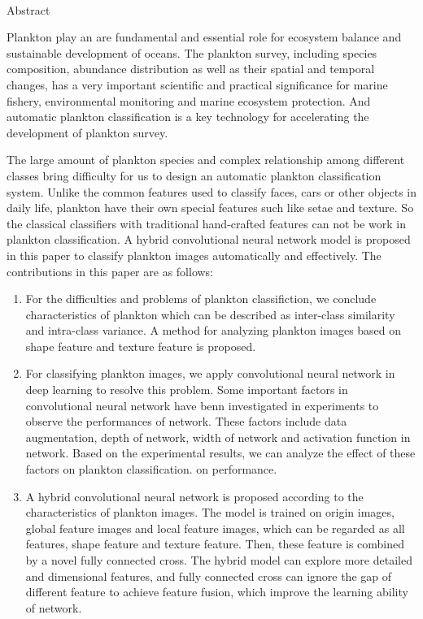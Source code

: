 \newpage

\begin{center}
  {\sanhao[1.5]\heiti\oucetitle\\\vskip7pt Abstract}
\end{center}
{\normalsize\songti

   Plankton play an are fundamental and essential role for ecosystem balance and sustainable development of oceans. The plankton survey, including species composition, abundance distribution as well as their spatial and temporal changes, has a very important scientific and practical significance for marine fishery, environmental monitoring and marine ecosystem protection. And automatic plankton classification is a key technology for accelerating the development of plankton survey. 

   The large amount of plankton species and complex relationship among different classes bring difficulty for us to design an automatic plankton classification system. Unlike the common features used to classify faces, cars or other objects in daily life, plankton have their own special features such like setae and texture. So the classical classifiers with traditional hand-crafted features can not be work in plankton classification. A hybrid convolutional neural network model is proposed in this paper to classify plankton images automatically and effectively. The contributions in this paper are as follows:

\begin{enumerate}
\item For the difficulties and problems of plankton classifiction, we conclude characteristics of plankton which can be described as inter-class similarity and intra-class variance. A method for analyzing plankton images based on shape feature and texture feature is proposed.
\item For classifying plankton images, we apply convolutional neural network in deep learning to resolve this problem. Some important factors in convolutional neural network have benn investigated in experiments to observe the performances of network. These factors include data augmentation, depth of network, width of network and activation function in network. Based on the experimental results, we can analyze the effect of these factors on plankton classification.
on performance.
\item A hybrid convolutional neural network is proposed according to the characteristics of plankton images. The model is trained on origin images, global feature images and local feature images, which can be regarded as all features, shape feature and texture feature. Then, these feature is combined by a novel fully connected cross. The hybrid model can explore more detailed and dimensional features, and fully connected cross can ignore the gap of different feature to achieve feature fusion, which improve the learning ability of network.
\end{enumerate}

}
